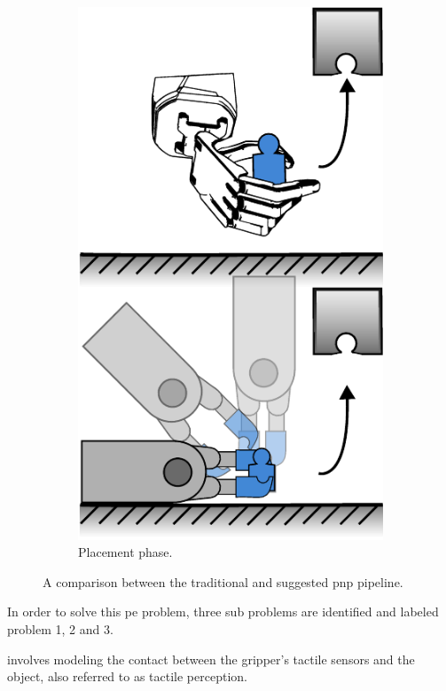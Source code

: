 \begin{figure}[h]
\begin{subfigure}[b]{0.24\textwidth}
		\includegraphics[width=\textwidth]{chapters/introduction/fig/pipeline-4.pdf}
		\caption{Placement phase.}
		\label{fig:placement-phase}
	\end{subfigure}
		\caption{A comparison between the traditional and suggested \gls{pnp} pipeline.}
		\label{fig:pnp-pipeline}
\end{figure}


In order to solve this \gls{pe} problem, three sub problems are identified and labeled problem 1, 2 and 3.
\begin{problem} \label{prob:1}
	\normalfont involves modeling the contact between the gripper's tactile sensors and the object, also referred to as tactile perception. 
\end{problem}

